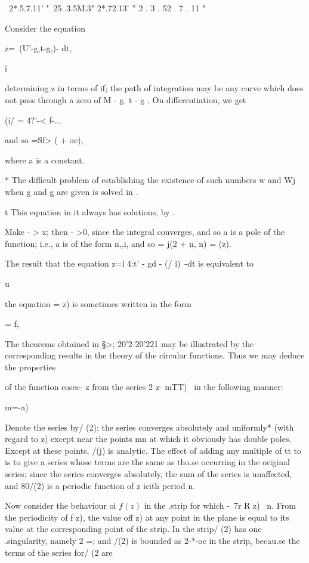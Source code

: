 { ~2*.5.7.11' "~25..3.5M.3" 2*.72.13' '' 2 . 3 . 52 . 7 . 11 "

 Consider the equation

z=\ (U'-g,t-g,)- dt,

  i

determining z in terms of if; the path of integration may be any
curve which does not pass through a zero of M - g. t - g . On
differentiation, we get

(i/ = 4?'-< f-...

and so =Sf> ( + oc),

where a is a constant.

* The difficult problem of establishing the existence of such numbers
w and Wj when g and g are given is solved in .

t This equation in it always has solutions, by .

%
%

Make - > x; then - >0, since the integral converges, and so a is a
pole of the function; i.e., a is of the form n,,i, and so = j(2 + n,
n) = (z).

The result that the equation z=l 4:t' - gd - (/ i)~-dt is equivalent
to

u

the equation = z) is sometimes written in the form

= f,


The theorems obtained in §>; 20'2-20'221 may be illustrated by the
corresponding results in the theory of the circular functions. Thus we
may deduce the properties

of the function cosec- z from the series 2 z- mTT)~ in the following
manner:

m=-a)

Denote the series by/ (2); the series converges absolutely and
uniformly* (with regard to z) except near the points mn at which it
obviously has double poles. Except at these points, /(j) is analytic.
The effect of adding any multiple of tt to is to give a series whose
terms are the same as tho.se occurring in the original series; since
the series converges absolutely, the sum of the series is unaffected,
and 80/(2) is a periodic function of z icith period n.

Now consider the behaviour oi $f(z)$ in the .strip for which -\ 7r R z)
\ n. From the periodicity of f z), the value off z) at any point in
the plane is equal to its value at the corresponding point of the
strip. In the strip/ (2) has one .singularity, namely 2 =; and /(2)
is bounded as 2-*-oc in the strip, becau.se the terms of the series
for/ (2 are

}
